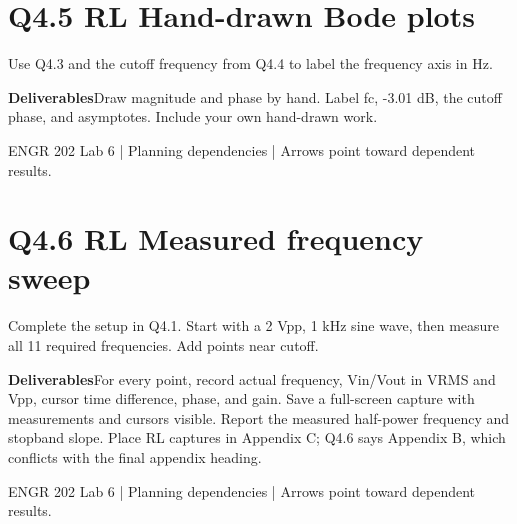 \documentclass[11pt]{article}
\begin{document}
\section*{Q4.5 RL Hand-drawn Bode plots}
Use Q4.3 and the cutoff frequency from Q4.4 to label the frequency axis in Hz.\par\medskip
\textbf{Deliverables}\quad Draw magnitude and phase by hand. Label fc, -3.01 dB, the cutoff phase, and asymptotes. Include your own hand-drawn work.\par\bigskip
\begin{center}\end{center}
\vfill\small ENGR 202 Lab 6 | Planning dependencies | Arrows point toward dependent results.
\newpage
\section*{Q4.6 RL Measured frequency sweep}
Complete the setup in Q4.1. Start with a 2 Vpp, 1 kHz sine wave, then measure all 11 required frequencies. Add points near cutoff.\par\medskip
\textbf{Deliverables}\quad For every point, record actual frequency, Vin/Vout in VRMS and Vpp, cursor time difference, phase, and gain. Save a full-screen capture with measurements and cursors visible. Report the measured half-power frequency and stopband slope. Place RL captures in Appendix C; Q4.6 says Appendix B, which conflicts with the final appendix heading.\par\bigskip
\begin{center}\end{center}
\vfill\small ENGR 202 Lab 6 | Planning dependencies | Arrows point toward dependent results.
\newpage
\end{document}
